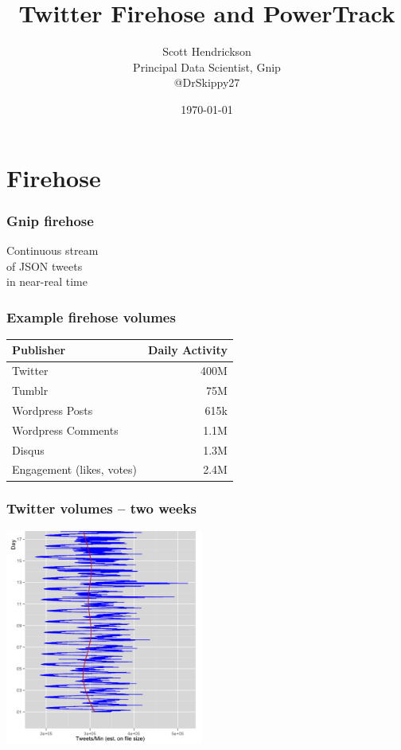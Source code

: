 \documentclass{beamer}
\begin{document}
\title{Twitter Firehose and PowerTrack}
\author{Scott Hendrickson \\ Principal Data Scientist, Gnip \\  @DrSkippy27}
\date{\today} 


\begin{frame}
\titlepage
\end{frame}


\section{Firehose}

\begin{frame}\frametitle{Gnip firehose}
\begin{center}
{\Large Continuous stream \\ [10pt] of JSON tweets \\ [15pt] in near-real time}
\end{center}
\end{frame}


\begin{frame} \frametitle{Example firehose volumes}
\begin{table}
\begin{tabular}{l|r}
\hline
   {Publisher}   &   {Daily Activity}   \\
\hline 
    Twitter      &      400M   \\
    Tumblr      &        75M   \\
    Wordpress Posts &     615k   \\
    Wordpress Comments & 1.1M \\
    Disqus       &       1.3M  \\
    Engagement (likes, votes) & 2.4M  \\
\hline
\end{tabular}
\end{table}
\end{frame}

\begin{frame}\frametitle{Twitter volumes -- two weeks}
  \begin{center}
    \includegraphics[width=6.5cm]{./imgs/tweets.png}
  \end{center}
\end{frame}
\end{document}
